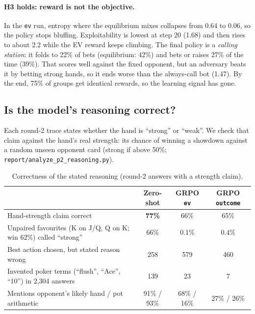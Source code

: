 \documentclass[10.5pt]{article}
\newcommand{\code}[1]{\texttt{#1}}
\begin{document}
\paragraph{H3 holds: reward is not the objective.} In the \code{ev} run, entropy where the equilibrium mixes collapses from
0.64 to 0.06, so the policy stops bluffing. Exploitability is lowest at step 20 (1.68) and then rises to about 2.2 while the
EV reward keeps climbing. The final policy is a \emph{calling station}: it folds to 22\% of bets (equilibrium: 42\%) and
bets or raises 27\% of the time (39\%). That scores well against the fixed opponent, but an adversary beats it by betting
strong hands, so it ends worse than the always-call bot (1.47). By the end, 75\% of groups get identical rewards, so the
learning signal has gone.

\subsection{Is the model's reasoning correct?}
Each round-2 trace states whether the hand is ``strong'' or ``weak''. We check that claim against the hand's real strength:
its chance of winning a showdown against a random unseen opponent card (strong if above 50\%;
\code{report/analyze\_p2\_reasoning.py}).

\begin{table}[H]
\centering\small
\begin{tabular}{lccc}
\toprule
 & Zero-shot & GRPO \code{ev} & GRPO \code{outcome}\\
\midrule
Hand-strength claim correct & \textbf{77\%} & 66\% & 65\%\\
Unpaired favourites (K on J/Q, Q on K; win 62\%) called ``strong'' & 66\% & 0.1\% & 0.4\%\\
Best action chosen, but stated reason wrong & 258 & 579 & 460\\
Invented poker terms (``flush'', ``Ace'', ``10'') in 2,304 answers & 139 & 23 & 7\\
Mentions opponent's likely hand / pot arithmetic & 91\% / 93\% & 68\% / 16\% & 27\% / 26\%\\
\bottomrule
\end{tabular}
\caption{Correctness of the stated reasoning (round-2 answers with a strength claim).}
\label{tab:reason}
\end{table}
\end{document}
